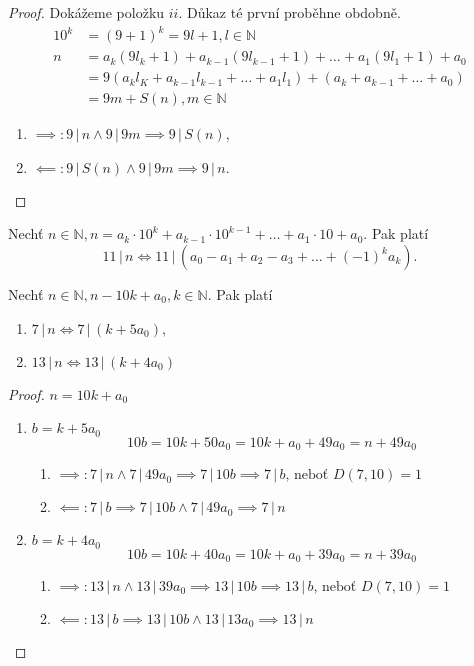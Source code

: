 \begin{proof}
  Dokážeme položku $ii$. Důkaz té první proběhne obdobně.
  \begin{align*}
    10^k & = (9+1)^k = 9l+1, l \in \mathbb N \\
    n & = a_k(9l_k+1)+a_{k-1}(9l_{k-1}+1)+\dots + a_1(9l_1+1)+a_0 \\
      & = 9(a_kl_K+a_{k-1}l_{k-1}+\dots+a_1l_1)+(a_k+a_{k-1}+\dots+a_0) \\
      & = 9m+S(n), m \in \mathbb N
  \end{align*}
  \begin{enumerate}
    \item $\implies: 9 \, | \, n \land 9 \, | \, 9m \implies 9 \, | \, S(n)$,
    \item $\impliedby: 9 \, | \, S(n) \land 9 \, | \, 9m \implies 9 \, | \, n.$ \qedhere
  \end{enumerate}
\end{proof}

\begin{veta}
  Nechť $n\in \mathbb N, n=a_k\cdot 10^k + a_{k-1}\cdot 10^{k-1}+\dots+a_1\cdot 10+ a_0$. Pak platí 
  \[
    11 \, | \, n \iff 11 \, | \, (a_0-a_1+a_2-a_3+\dots+(-1)^k a_k).
  \]
\end{veta}

\begin{veta}
  Nechť $n\in \mathbb N, n-10k+a_0,k\in \mathbb N.$ Pak platí
  \begin{enumerate}[$i.$]
    \item $7 \, | \, n \iff 7 \, | \, (k+5a_0),$
    \item $13 \, | \, n \iff 13 \, | \, (k+4a_0) $ 
  \end{enumerate}
\end{veta}

\begin{proof}
  $n=10k+a_0$
  \begin{enumerate}[$i.$]
    \item $b=k+5a_0$ 
      \[
        10b=10k+50a_0=10k+a_0+49a_0=n+49a_0
      \]
      \begin{enumerate}
        \item $\implies: 7 \, | \, n \land 7 \, | \, 49a_0 \implies 7 \, | \, 10b \implies 7 \, | \, b \textrm{, neboť } D(7,10)=1$
        \item $\impliedby: 7 \, | \, b \implies 7 \, | \, 10 b \land 7 \, | \, 49 a_0 \implies 7 \, | \, n$
      \end{enumerate}
    \item $b=k+4a_0$
      \[
        10b=10k+40a_0=10k+a_0+39a_0=n+39a_0
      \]
      \begin{enumerate}
        \item $\implies: 13 \, | \, n \land 13 \, | \, 39a_0 \implies 13 \, | \, 10b \implies 13 \, | \, b \textrm{, neboť } D(7,10)=1$
        \item $\impliedby: 13 \, | \, b \implies  13 \, | \, 10 b \land 13 \, | \, 13a_0 \implies 13 \, | \, n$ \qedhere
      \end{enumerate}
  \end{enumerate}
\end{proof}


